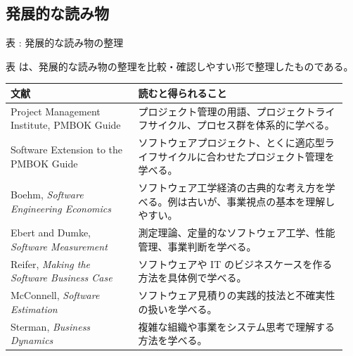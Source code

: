 \subsection{発展的な読み物}

\par\smallskip\noindent{}\label{tab:ch15-05}表 \thetable: 発展的な読み物の整理\par\smallskip
表 \thetable は、発展的な読み物の整理を比較・確認しやすい形で整理したものである。\par\smallskip
\begin{longtable}{L{0.36\linewidth} L{0.59\linewidth}}
\toprule
文献 & 読むと得られること \\
\midrule
Project Management Institute, PMBOK Guide & プロジェクト管理の用語、プロジェクトライフサイクル、プロセス群を体系的に学べる。 \\
Software Extension to the PMBOK Guide & ソフトウェアプロジェクト、とくに適応型ライフサイクルに合わせたプロジェクト管理を学べる。 \\
Boehm, \textit{Software Engineering Economics} & ソフトウェア工学経済の古典的な考え方を学べる。例は古いが、事業視点の基本を理解しやすい。 \\
Ebert and Dumke, \textit{Software Measurement} & 測定理論、定量的なソフトウェア工学、性能管理、事業判断を学べる。 \\
Reifer, \textit{Making the Software Business Case} & ソフトウェアや IT のビジネスケースを作る方法を具体例で学べる。 \\
McConnell, \textit{Software Estimation} & ソフトウェア見積りの実践的技法と不確実性の扱いを学べる。 \\
Sterman, \textit{Business Dynamics} & 複雑な組織や事業をシステム思考で理解する方法を学べる。 \\
\bottomrule
\end{longtable}
